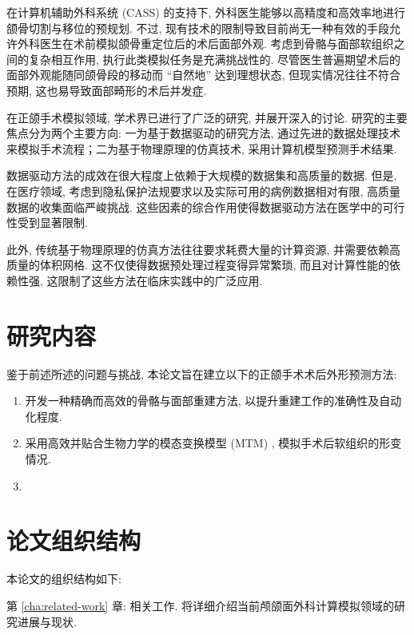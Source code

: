 在计算机辅助外科系统 (CASS) 的支持下, 外科医生能够以高精度和高效率地进行颌骨切割与移位的预规划.
不过, 现有技术的限制导致目前尚无一种有效的手段允许外科医生在术前模拟颌骨重定位后的术后面部外观.
考虑到骨骼与面部软组织之间的复杂相互作用, 执行此类模拟任务是充满挑战性的.
尽管医生普遍期望术后的面部外观能随同颌骨段的移动而 ``自然地'' 达到理想状态, 但现实情况往往不符合预期, 这也易导致面部畸形的术后并发症.

在正颌手术模拟领域, 学术界已进行了广泛的研究, 并展开深入的讨论.
研究的主要焦点分为两个主要方向: 一为基于数据驱动的研究方法, 通过先进的数据处理技术来模拟手术流程；二为基于物理原理的仿真技术, 采用计算机模型预测手术结果.

数据驱动方法的成效在很大程度上依赖于大规模的数据集和高质量的数据.
但是, 在医疗领域, 考虑到隐私保护法规要求以及实际可用的病例数据相对有限, 高质量数据的收集面临严峻挑战.
这些因素的综合作用使得数据驱动方法在医学中的可行性受到显著限制.

此外, 传统基于物理原理的仿真方法往往要求耗费大量的计算资源, 并需要依赖高质量的体积网格.
这不仅使得数据预处理过程变得异常繁琐, 而且对计算性能的依赖性强, 这限制了这些方法在临床实践中的广泛应用.

\section{研究内容}

鉴于前述所述的问题与挑战, 本论文旨在建立以下的正颌手术术后外形预测方法:
\begin{enumerate}
  \item 开发一种精确而高效的骨骼与面部重建方法, 以提升重建工作的准确性及自动化程度.
  \item 采用高效并贴合生物力学的模态变换模型 (MTM) , 模拟手术后软组织的形变情况.
  \item {}
\end{enumerate}

\section{论文组织结构}

本论文的组织结构如下:

第 \ref{cha:related-work} 章: 相关工作.
将详细介绍当前颅颌面外科计算模拟领域的研究进展与现状.

